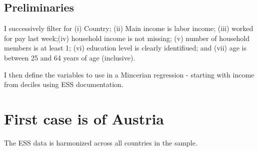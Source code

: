 \documentclass[]{article}
\begin{document}
\hypertarget{preliminaries}{%
\subsection{Preliminaries}\label{preliminaries}}

I successively filter for (i) Country; (ii) Main income is labor income;
(iii) worked for pay last week;(iv) household income is not missing; (v)
number of household members is at least 1; (vi) education level is
clearly identifiued; and (vii) age is between 25 and 64 years of age
(inclusive).

I then define the variables to use in a Mincerian regression - starting
with income from deciles using ESS documentation.

\hypertarget{first-case-is-of-austria}{%
\section{First case is of Austria}\label{first-case-is-of-austria}}

The ESS data is harmonized across all countries in the sample.
\end{document}
